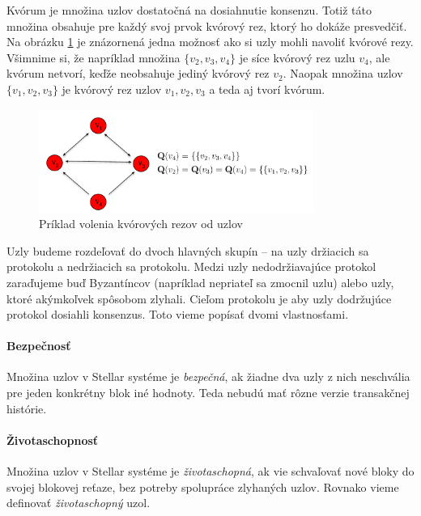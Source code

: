 \begin{flushleft}
Kvórum je množina uzlov dostatočná na dosiahnutie konsenzu. Totiž táto množina obsahuje
pre každý svoj prvok kvórový rez, ktorý ho dokáže presvedčiť.
Na obrázku \ref{obr:kvorum} je znázornená jedna možnosť ako si uzly mohli navoliť
kvórové rezy.
Všimnime si, že napríklad množina $\{v_2, v_3, v_4\}$ je síce kvórový rez uzlu
$v_4$, ale kvórum netvorí, keďže neobsahuje jediný kvórový rez $v_2$.
Naopak množina uzlov $\{v_1, v_2, v_3\}$ je kvórový rez uzlov $v_1, v_2, v_3$ a
teda aj tvorí kvórum.

\begin{figure}
\centerline{\includegraphics[width=0.8\textwidth]{images/kvorum.pdf}}
\caption[Príklad siete]{Príklad volenia kvórových rezov od uzlov} \label{obr:kvorum}
\end{figure}

\end{flushleft}

Uzly budeme rozdeľovať do dvoch hlavných skupín -- na uzly držiacich sa protokolu a
nedržiacich sa protokolu. Medzi uzly nedodržiavajúce protokol zaraďujeme buď
Byzantíncov (napríklad nepriateľ sa zmocnil uzlu) alebo uzly, ktoré akýmkoľvek
spôsobom zlyhali.
Cieľom protokolu je aby uzly dodržujúce protokol dosiahli konsenzus. Toto vieme
popísať dvomi vlastnosťami.

\paragraph {Bezpečnosť} Množina uzlov v Stellar systéme je \textit{bezpečná}, ak žiadne
dva uzly z nich neschvália pre jeden konkrétny blok iné hodnoty. Teda nebudú mať
rôzne verzie transakčnej histórie.

\paragraph {Životaschopnosť} Množina uzlov v Stellar systéme je \textit{životaschopná},
ak vie schvaľovať nové bloky do svojej blokovej reťaze, bez potreby spolupráce
zlyhaných uzlov. Rovnako vieme definovať \textit{životaschopný} uzol.

